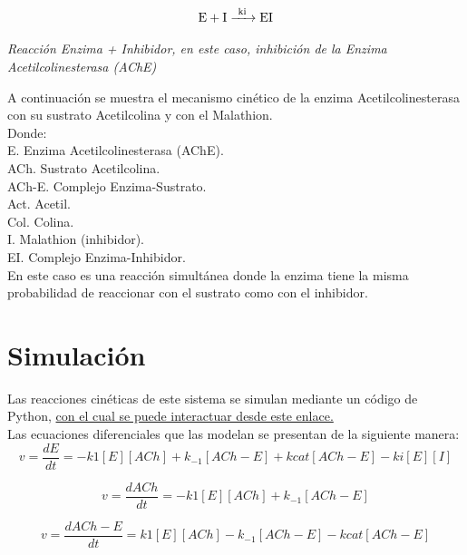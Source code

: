 \begin{Eq} [h!]
	\begin{equation}
		\ce{E + I ->[ki] EI}
	\end{equation}
	\caption{\textit{Reacción Enzima + Inhibidor, en este caso, inhibición de la Enzima Acetilcolinesterasa (AChE) }}
\end{Eq}

A continuación se muestra el mecanismo cinético de la enzima Acetilcolinesterasa con su sustrato Acetilcolina y con el Malathion.\\

Donde:\\

E.	Enzima Acetilcolinesterasa (AChE).\\
ACh.	Sustrato Acetilcolina.\\
ACh-E.	Complejo Enzima-Sustrato.\\
Act.	Acetil.\\
Col.	Colina.\\
I.	Malathion (inhibidor).\\
EI. Complejo Enzima-Inhibidor.\\

En este caso es una reacción simultánea donde la enzima tiene la misma probabilidad de reaccionar con el sustrato como con el inhibidor.

\section{Simulación}
Las reacciones cinéticas de este sistema se simulan mediante un código de Python, \href{https://colab.research.google.com/drive/1STolipp3le7wWiyVhjlUpjwr8-pAcXaQ?usp=sharing}{con el cual se puede interactuar desde este enlace.}\\
Las ecuaciones diferenciales que las modelan se presentan de la siguiente manera:\\

\begin{equation}
	v= \frac{dE}{dt} = -k1[E][ACh] + k_{-1}[ACh-E] + kcat [ACh-E] - ki [E] [I]
\end{equation}

\begin{equation}
	v= \frac{dACh}{dt} = -k1[E][ACh] + k_{-1}[ACh-E]
\end{equation}

\begin{equation}
	v= \frac{dACh-E}{dt} = k1[E][ACh] - k_{-1}[ACh-E] -kcat[ACh-E]
\end{equation}

